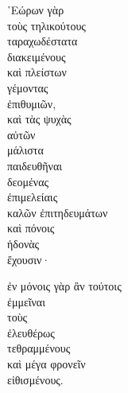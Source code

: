 {\large
\begin{greek}
\noindent ῾Εώρων γὰρ \\
\tabto{2em} τοὺς τηλικούτους \\
\tabto{4em} ταραχωδέστατα \\
\tabto{2em} διακειμένους \\
\tabto{2em} καὶ πλείστων \\
\tabto{4em} γέμοντας \\
\tabto{2em} ἐπιθυμιῶν, \\
\tabto{2em} καὶ τὰς ψυχὰς \\
\tabto{4em} αὐτῶν \\
\tabto{4em} μάλιστα \\
\tabto{4em} παιδευθῆναι \\
\tabto{2em} δεομένας \\
\tabto{4em} ἐπιμελείαις \\
\tabto{6em} καλῶν ἐπιτηδευμάτων \\
\tabto{4em} καὶ πόνοις \\
\tabto{6em} ἡδονὰς \\
\tabto{4em} ἔχουσιν·

\tabto{2em} ἐν μόνοις γὰρ ἂν τούτοις \\
\tabto{4em} ἐμμεῖναι \\
\tabto{4em} τοὺς \\
\tabto{6em} ἐλευθέρως \\
\tabto{4em} τεθραμμένους \\
\tabto{4em} καὶ μέγα φρονεῖν \\
\tabto{4em} εἰθισμένους.\\

\end{greek}
}

